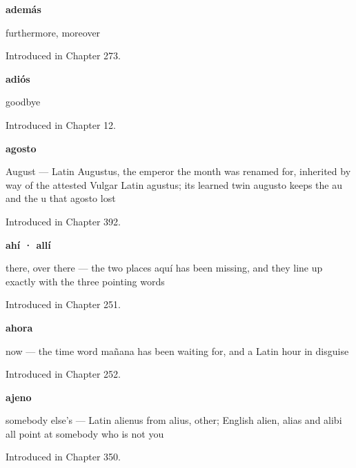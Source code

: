 \noindent\begin{minipage}[t]{\linewidth}
\raggedright
\textbf{además}\par
\small furthermore, moreover\par
\footnotesize Introduced in Chapter 273.
\end{minipage}\par\medskip

\noindent\begin{minipage}[t]{\linewidth}
\raggedright
\textbf{adiós}\par
\small goodbye\par
\footnotesize Introduced in Chapter 12.
\end{minipage}\par\medskip

\noindent\begin{minipage}[t]{\linewidth}
\raggedright
\textbf{agosto}\par
\small August — Latin Augustus, the emperor the month was renamed for, inherited by way of the attested Vulgar Latin agustus; its learned twin augusto keeps the au and the u that agosto lost\par
\footnotesize Introduced in Chapter 392.
\end{minipage}\par\medskip

\noindent\begin{minipage}[t]{\linewidth}
\raggedright
\textbf{ahí · allí}\par
\small there, over there — the two places aquí has been missing, and they line up exactly with the three pointing words\par
\footnotesize Introduced in Chapter 251.
\end{minipage}\par\medskip

\noindent\begin{minipage}[t]{\linewidth}
\raggedright
\textbf{ahora}\par
\small now — the time word mañana has been waiting for, and a Latin hour in disguise\par
\footnotesize Introduced in Chapter 252.
\end{minipage}\par\medskip

\noindent\begin{minipage}[t]{\linewidth}
\raggedright
\textbf{ajeno}\par
\small somebody else's — Latin alienus from alius, other; English alien, alias and alibi all point at somebody who is not you\par
\footnotesize Introduced in Chapter 350.
\end{minipage}\par\medskip

